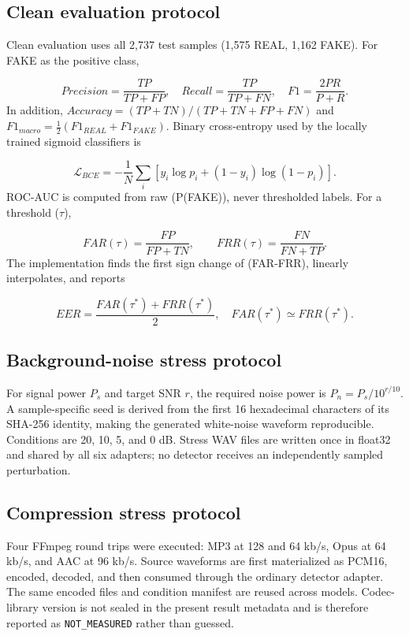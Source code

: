\documentclass[10pt,journal,onecolumn]{IEEEtran}
\begin{document}
\subsection{Clean evaluation protocol}
Clean evaluation uses all 2,737 test samples (1,575 REAL, 1,162 FAKE). For FAKE as the positive class,

\begin{equation}
Precision=\frac{TP}{TP+FP},\quad Recall=\frac{TP}{TP+FN},\quad F1=\frac{2PR}{P+R}.
\end{equation}
In addition, $Accuracy=(TP+TN)/(TP+TN+FP+FN)$ and $F1_{macro}=\frac{1}{2}(F1_{REAL}+F1_{FAKE})$. Binary cross-entropy used by the locally trained sigmoid classifiers is

\begin{equation}
\mathcal{L}_{BCE}=-\frac{1}{N}\sum_i[y_i\log p_i+(1-y_i)\log(1-p_i)].
\end{equation}
ROC-AUC is computed from raw (P(FAKE)), never thresholded labels. For a threshold ($\tau$),

\begin{equation}
FAR(\tau)=\frac{FP}{FP+TN},\qquad FRR(\tau)=\frac{FN}{FN+TP}.
\end{equation}
The implementation finds the first sign change of (FAR-FRR), linearly interpolates, and reports

\begin{equation}
EER=\frac{FAR(\tau^*)+FRR(\tau^*)}{2},\quad FAR(\tau^*)\simeq FRR(\tau^*).
\end{equation}
\subsection{Background-noise stress protocol}
For signal power $P_s$ and target SNR $r$, the required noise power is $P_n=P_s/10^{r/10}$. A sample-specific seed is derived from the first 16 hexadecimal characters of its SHA-256 identity, making the generated white-noise waveform reproducible. Conditions are 20, 10, 5, and 0 dB. Stress WAV files are written once in float32 and shared by all six adapters; no detector receives an independently sampled perturbation.

\subsection{Compression stress protocol}
Four FFmpeg round trips were executed: MP3 at 128 and 64 kb/s, Opus at 64 kb/s, and AAC at 96 kb/s. Source waveforms are first materialized as PCM16, encoded, decoded, and then consumed through the ordinary detector adapter. The same encoded files and condition manifest are reused across models. Codec-library version is not sealed in the present result metadata and is therefore reported as \texttt{NOT\_MEASURED} rather than guessed.
\end{document}
